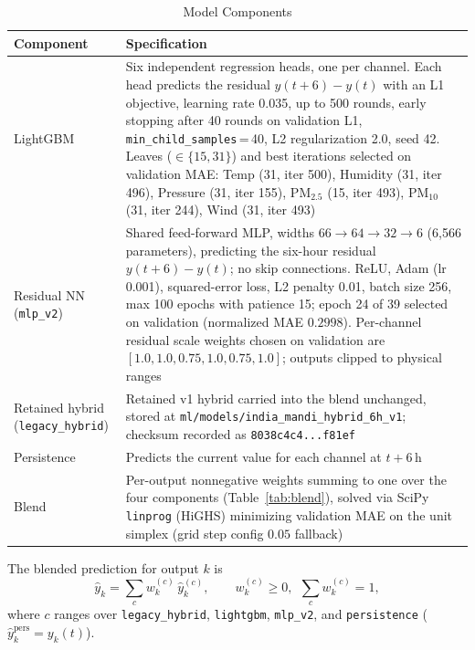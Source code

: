 \documentclass[journal,a4paper]{IEEEtran}
\begin{document}
\begin{table}[!htbp]
\caption{Model Components}
\label{tab:models}
\centering
\footnotesize
\begin{tabular}{@{}p{0.78in}p{2.35in}@{}}
\toprule
Component & Specification \\
\midrule
LightGBM & Six independent regression heads, one per channel. Each head predicts the residual $y(t{+}6)-y(t)$ with an L1 objective, learning rate 0.035, up to 500 rounds, early stopping after 40 rounds on validation L1, \texttt{min\_child\_samples}\,=\,40, L2 regularization 2.0, seed 42. Leaves ($\in \{15, 31\}$) and best iterations selected on validation MAE: Temp (31, iter 500), Humidity (31, iter 496), Pressure (31, iter 155), PM$_{2.5}$ (15, iter 493), PM$_{10}$ (31, iter 244), Wind (31, iter 493) \\
Residual NN (\texttt{mlp\_v2}) & Shared feed-forward MLP, widths $66 \rightarrow 64 \rightarrow 32 \rightarrow 6$ (6{,}566 parameters), predicting the six-hour residual $y(t{+}6)-y(t)$; no skip connections. ReLU, Adam (lr 0.001), squared-error loss, L2 penalty 0.01, batch size 256, max 100 epochs with patience 15; epoch 24 of 39 selected on validation (normalized MAE $0.2998$). Per-channel residual scale weights chosen on validation are $[1.0, 1.0, 0.75, 1.0, 0.75, 1.0]$; outputs clipped to physical ranges \\
Retained hybrid (\texttt{legacy\_hybrid}) & Retained v1 hybrid carried into the blend unchanged, stored at \nolinkurl{ml/models/india_mandi_hybrid_6h_v1}; checksum recorded as \texttt{8038c4c4...f81ef} \\
Persistence & Predicts the current value for each channel at $t+6\,\text{h}$ \\
Blend & Per-output nonnegative weights summing to one over the four components (Table~\ref{tab:blend}), solved via SciPy \texttt{linprog} (HiGHS) minimizing validation MAE on the unit simplex (grid step config $0.05$ fallback) \\
\bottomrule
\end{tabular}
\end{table}

The blended prediction for output $k$ is
\begin{equation}
\hat{y}_k = \sum_{c} w_{k}^{(c)}\,\hat{y}_k^{(c)}, \qquad w_k^{(c)} \ge 0,\ \ \sum_c w_k^{(c)}=1,
\end{equation}
where $c$ ranges over \texttt{legacy\_hybrid}, \texttt{lightgbm}, \texttt{mlp\_v2}, and \texttt{persistence} ($\hat{y}_k^{\text{pers}} = y_k(t)$).
\end{document}
